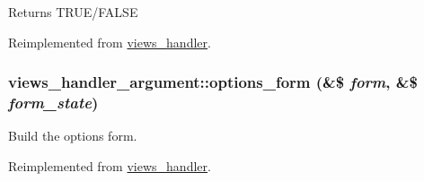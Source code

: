 \begin{DoxyReturn}{Returns}
TRUE/FALSE 
\end{DoxyReturn}


Reimplemented from \hyperlink{classviews__handler_a53baa97a6c218ce4b847c8fb4e65a350}{views\_\-handler}.\hypertarget{classviews__handler__argument_a44f015a0d527983ae6df2689f66b2c24}{
\subsubsection[{options\_\-form}]{\setlength{\rightskip}{0pt plus 5cm}views\_\-handler\_\-argument::options\_\-form (\&\$ {\em form}, \/  \&\$ {\em form\_\-state})}}
\label{classviews__handler__argument_a44f015a0d527983ae6df2689f66b2c24}
Build the options form. 

Reimplemented from \hyperlink{classviews__handler_aa41fcf16b177eb03e35facbae6320f74}{views\_\-handler}.

